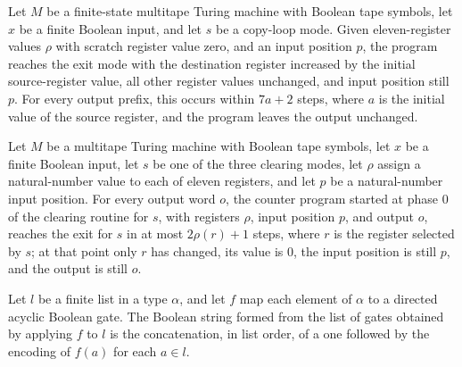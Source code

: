 \begin{theorem}
\label{Complexity.UTab.goes_copy}
\leanok
{}
Let $M$ be a finite-state multitape Turing machine with Boolean tape symbols, let $x$ be
a finite Boolean input, and let $s$ be a copy-loop mode. Given eleven-register values
$\rho$ with scratch register value zero, and an input position $p$, the program reaches
the exit mode with the destination register increased by the initial source-register
value, all other register values unchanged, and input position still $p$. For every
output prefix, this occurs within $7a+2$ steps, where $a$ is the initial value of the
source register, and the program leaves the output unchanged.
\end{theorem}

\begin{theorem}
\label{Complexity.UTab.goes_clear}
\leanok
{}
Let $M$ be a multitape Turing machine with Boolean tape symbols, let $x$ be a finite
Boolean input, let $s$ be one of the three clearing modes, let $\rho$ assign a
natural-number value to each of eleven registers, and let $p$ be a natural-number input
position. For every output word $o$, the counter program started at phase $0$ of the
clearing routine for $s$, with registers $\rho$, input position $p$, and output $o$,
reaches the exit for $s$ in at most $2\rho(r)+1$ steps, where $r$ is the register
selected by $s$; at that point only $r$ has changed, its value is $0$, the input
position is still $p$, and the output is still $o$.
\end{theorem}

\begin{theorem}
\label{Complexity.UTab.gbits_map}
\leanok
{}
Let $l$ be a finite list in a type $\alpha$, and let $f$ map each element of $\alpha$ to
a directed acyclic Boolean gate. The Boolean string formed from the list of gates
obtained by applying $f$ to $l$ is the concatenation, in list order, of a one followed
by the encoding of $f(a)$ for each $a\in l$.
\end{theorem}

